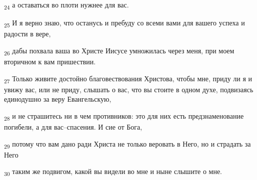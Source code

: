\begin{tcolorbox}
\textsubscript{24} а оставаться во плоти нужнее для вас.
\end{tcolorbox}
\begin{tcolorbox}
\textsubscript{25} И я верно знаю, что останусь и пребуду со всеми вами для вашего успеха и радости в вере,
\end{tcolorbox}
\begin{tcolorbox}
\textsubscript{26} дабы похвала ваша во Христе Иисусе умножилась через меня, при моем вторичном к вам пришествии.
\end{tcolorbox}
\begin{tcolorbox}
\textsubscript{27} Только живите достойно благовествования Христова, чтобы мне, приду ли я и увижу вас, или не приду, слышать о вас, что вы стоите в одном духе, подвизаясь единодушно за веру Евангельскую,
\end{tcolorbox}
\begin{tcolorbox}
\textsubscript{28} и не страшитесь ни в чем противников: это для них есть предзнаменование погибели, а для вас--спасения. И сие от Бога,
\end{tcolorbox}
\begin{tcolorbox}
\textsubscript{29} потому что вам дано ради Христа не только веровать в Него, но и страдать за Него
\end{tcolorbox}
\begin{tcolorbox}
\textsubscript{30} таким же подвигом, какой вы видели во мне и ныне слышите о мне.
\end{tcolorbox}
